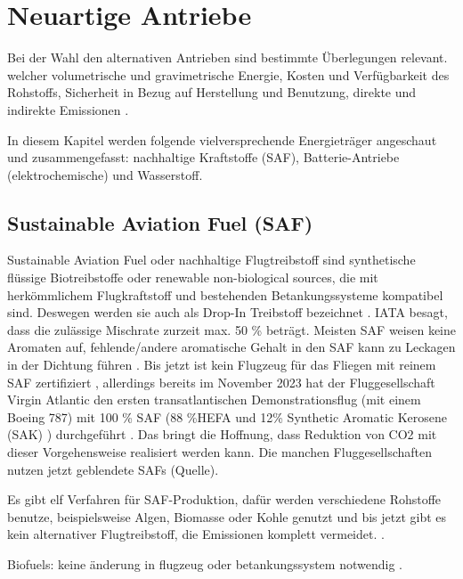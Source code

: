 
\section{Neuartige Antriebe}
Bei der Wahl den alternativen Antrieben sind bestimmte Überlegungen relevant. welcher volumetrische und gravimetrische Energie, Kosten 
und Verfügbarkeit des Rohstoffs, Sicherheit in Bezug auf Herstellung und Benutzung, 
direkte und indirekte  Emissionen \cite{ansell2023review}.



In diesem Kapitel werden folgende vielversprechende Energieträger angeschaut und zusammengefasst: nachhaltige Kraftstoffe (SAF), 
Batterie-Antriebe (elektrochemische) und Wasserstoff.



\subsection{Sustainable Aviation Fuel (SAF)}

Sustainable Aviation Fuel oder nachhaltige Flugtreibstoff sind synthetische flüssige Biotreibstoffe oder renewable non-biological sources, 
die mit herkömmlichem Flugkraftstoff und bestehenden Betankungssysteme kompatibel sind. Deswegen werden sie auch als Drop-In Treibstoff bezeichnet
\cite{iata_saf_2024}. IATA besagt, dass die zulässige Mischrate zurzeit max. 50 \% beträgt. Meisten SAF weisen keine Aromaten auf, 
fehlende/andere aromatische Gehalt in den SAF kann zu Leckagen in der Dichtung führen \cite{jarin2024emissions}. 
Bis jetzt ist kein Flugzeug für das Fliegen mit reinem SAF zertifiziert \cite{iata_saf_2024}, 
allerdings bereits im November 2023 hat der Fluggesellschaft Virgin Atlantic den ersten transatlantischen Demonstrationsflug 
(mit einem Boeing 787) mit 100 \% SAF (88 \%HEFA und 12\% Synthetic Aromatic Kerosene (SAK) ) durchgeführt \cite{virginatlantic_saf_2023}.
Das bringt die Hoffnung, dass Reduktion von CO2 mit dieser Vorgehensweise realisiert werden kann. Die manchen Fluggesellschaften nutzen jetzt
geblendete SAFs (Quelle). 

Es gibt elf Verfahren für SAF-Produktion, dafür werden verschiedene Rohstoffe benutze, beispielsweise Algen, Biomasse oder Kohle 
genutzt und bis jetzt gibt es kein alternativer Flugtreibstoff, die Emissionen komplett vermeidet. \cite{icao_saf_conversion_2024}.

Biofuels: keine änderung in flugzeug oder betankungssystem notwendig \cite{sky2020hydrogen}.

